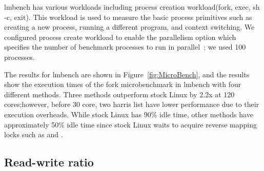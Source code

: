 lmbench has various workloads including process creation workload(fork,
exec, sh -c, exit).
This workload is used to measure the basic process primitives such as creating
a new process, running a different program, and context switching. 
We configured process create workload to enable the parallelism option which
specifies the number of benchmark processes to run in
parallel~\cite{mcvoy1996lmbench}; we used 100 processes.

The results for lmbench are shown in Figure~\ref{fig:MicroBench}, 
and the results show the execution times of the fork microbenchmark in lmbench
with four different methods.
Three methods outperform stock Linux by 2.2x at 120 cores;however, before 30
core, two harris list have lower performance due to their execution overheads.
While stock Linux has 90\% idle time, other methods have approximately 50\%
idle time since stock Linux waits to acquire reverse mapping locks such as
 and .


\subsection{Read-write ratio}

